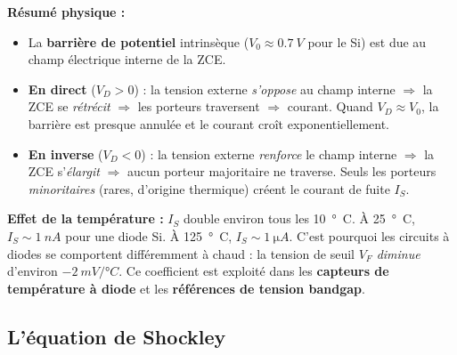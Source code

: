 \documentclass[12pt,a4paper,twoside]{book}
\begin{document}
\begin{center}
\end{center}

\begin{formule}
\textbf{Résumé physique :}
\begin{itemize}[nosep]
\item La \textbf{barrière de potentiel} intrinsèque ($V_0 \approx \SI{0.7}{V}$ pour le Si) est due au champ électrique interne de la ZCE.
\item \textbf{En direct} ($V_D > 0$) : la tension externe \textit{s'oppose} au champ interne $\Rightarrow$ la ZCE se \textit{rétrécit} $\Rightarrow$ les porteurs traversent $\Rightarrow$ courant. Quand $V_D \approx V_0$, la barrière est presque annulée et le courant croît exponentiellement.
\item \textbf{En inverse} ($V_D < 0$) : la tension externe \textit{renforce} le champ interne $\Rightarrow$ la ZCE s'\textit{élargit} $\Rightarrow$ aucun porteur majoritaire ne traverse. Seuls les porteurs \textit{minoritaires} (rares, d'origine thermique) créent le courant de fuite $I_S$.
\end{itemize}
\end{formule}

\begin{attention}
\textbf{Effet de la température :} $I_S$ double environ tous les \SI{10}{°C}. À \SI{25}{°C}, $I_S \sim \SI{1}{nA}$ pour une diode Si. À \SI{125}{°C}, $I_S \sim \SI{1}{\micro A}$. C'est pourquoi les circuits à diodes se comportent différemment à chaud : la tension de seuil $V_F$ \textit{diminue} d'environ $\SI{-2}{mV/°C}$. Ce coefficient est exploité dans les \textbf{capteurs de température à diode} et les \textbf{références de tension bandgap}.
\end{attention}

\subsection{L'équation de Shockley}
\end{document}
